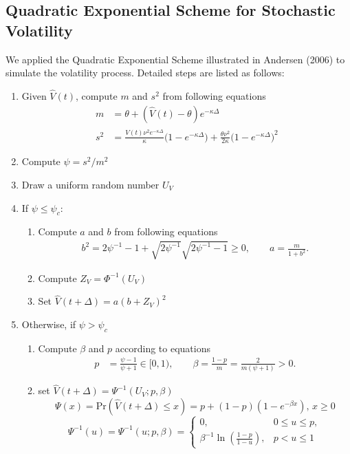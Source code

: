 \documentclass{ws-ijfe}
\begin{document}
\subsection{Quadratic Exponential Scheme for Stochastic Volatility}
We applied the Quadratic Exponential Scheme illustrated in Andersen (2006) \cite{Andersen} to simulate the volatility process. Detailed steps are listed as follows:
\begin{enumerate}
\item Given $\hat{V}(t)$, compute $m$ and $s^2$ from following equations
\begin{align*}
  m &=\theta + (\hat{V}(t)-\theta)e^{-\kappa\Delta} \\
  s^2 &=\frac{\hat{V}(t)\nu^2 e^{-\kappa\Delta}}{\kappa}\bigg(1-e^{-\kappa\Delta}\bigg)+\frac{\theta\nu^2}{2\kappa}\bigg(1-e^{-\kappa\Delta}\bigg)^2
\end{align*}
\item Compute $\psi=s^2/m^2$\\
\item Draw a uniform random number $U_V$
\item If $\psi\leq\psi_c$:
\begin{enumerate}
\item Compute $a$ and $b$ from following equations
\begin{align*}
b^2=2\psi^{-1}-1+\sqrt{2\psi^{-1}}\sqrt{2\psi^{-1}-1}\geq 0, \qquad a =\frac{m}{1+b^2}.
\end{align*}
\item Compute $Z_V=\Phi^{-1}(U_V)$
\item Set $\hat{V}(t+\Delta)=a(b+Z_V)^2$
\end{enumerate}
\item Otherwise, if $\psi>\psi_c$
\begin{enumerate}
  \item Compute $\beta$ and $p$ according to equations
  \begin{align*}
    p & =\frac{\psi-1}{\psi+1}\in[0,1), \qquad%
    \beta =\frac{1-p}{m}=\frac{2}{m(\psi+1)}>0.
  \end{align*}
  \item set $\hat{V}(t+\Delta)=\Psi^{-1}(U_V;p,\beta)$
  \begin{equation*}
    \Psi(x) = \text{Pr}(\hat{V}(t+\Delta)\leq x) = p+(1-p)(1-e^{-\beta x}),\, x\geq 0
  \end{equation*}
  \[
  \Psi^{-1}(u)=\Psi^{-1}(u;p,\beta)=
  \begin{cases}
    0,\,&0\leq u \leq p,\\
    \beta^{-1}\ln(\frac{1-p}{1-u}),&p<u\leq1
  \end{cases}
  \]
\end{enumerate}
\end{enumerate}
\end{document}
